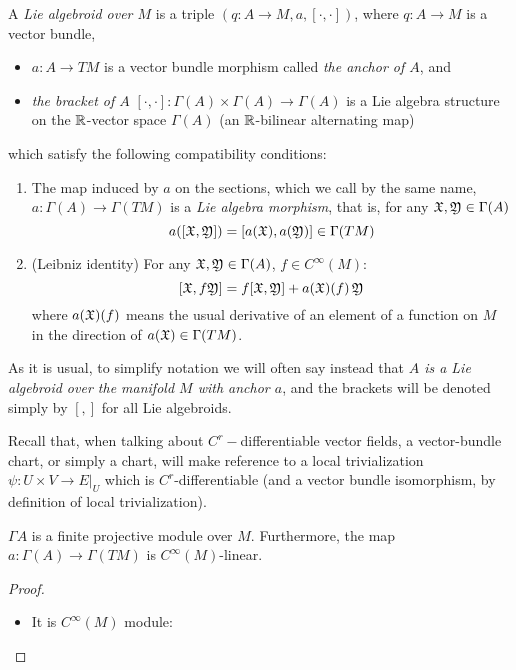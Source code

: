 \begin{definition} \label{defnLieAlgoid}
A \emph{Lie algebroid over $M$} is a triple $(q:A \to M, a, [\cdot, \cdot ])$, where $q:A \to M$ is a vector bundle, 
    \begin{itemize}
    \item $a:A \to TM$ is a vector bundle morphism called \emph{the anchor of $A$}, and
    \item \emph{the bracket of $A$} $[\cdot, \cdot ]: \Gamma(A) \times \Gamma(A) \to \Gamma(A)$ is a Lie algebra structure on the $\operatorname{\mathbb{R}}$-vector space $\Gamma(A)$ (an $\operatorname{\mathbb{R}}$-bilinear alternating map) 
    \end{itemize}  which satisfy the following compatibility conditions:

\begin{enumerate}
    \item The map induced by $a$ on the sections, which we call by the same name, $a:\Gamma(A) \to \Gamma(TM)$ is a \emph{Lie algebra morphism}, that is, for any $\mathfrak{X}, \mathfrak{Y} \in \Gamma(A)$ \[ a([\mathfrak{X}, \mathfrak{Y}])  = [a(\mathfrak{X}), a(\mathfrak{Y})] \in  \Gamma(TM)\]
    
    \item (Leibniz identity) For any $\mathfrak{X}, \mathfrak{Y} \in \Gamma(A)$, $f \in C^\infty (M)$: \[ [\mathfrak{X}, f\mathfrak{Y}] = f[\mathfrak{X}, \mathfrak{Y}] + a(\mathfrak{X})(f)\, \mathfrak{Y} \] where $a(\mathfrak{X})(f)$ means the usual derivative of an element of a function on $M$ in the direction of $a(\mathfrak{X}) \in \Gamma(TM)$.
\end{enumerate}
\end{definition}

As it is usual, to simplify notation we will often say instead that \emph{$A$ is a Lie algebroid over the manifold $M$ with anchor $a$}, and the brackets will be denoted simply by $[,]$ for all Lie algebroids.

Recall that, when talking about $C^r-$differentiable vector fields, a vector-bundle chart, or simply a chart, will make reference to a local trivialization $\psi: U \times V \to E|_U$ which is $C^r$-differentiable (and a vector bundle isomorphism, by definition of local trivialization).


\begin{proposition}
$\Gamma A$ is a finite projective module over $M$. Furthermore, the map $a: \Gamma(A) \to \Gamma(TM)$ is $C^\infty(M)$-linear.
\end{proposition}
\begin{proof}
    \begin{itemize}
    \item It is $C^\infty(M)$ module:
    \end{itemize}
\end{proof}

